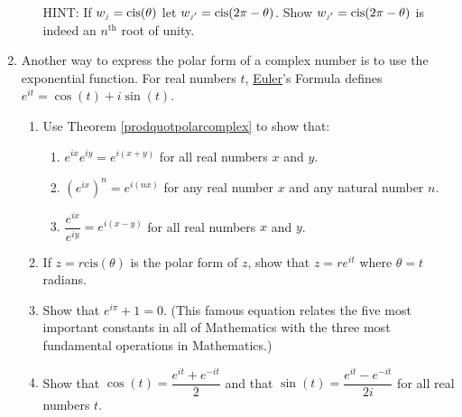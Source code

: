 \begin{enumerate}
\begin{enumerate}
 HINT: If $w_{\text{\tiny$j$}} = \text{cis}(\theta)$ let $w_{\text{\tiny$j'$}} = \text{cis}(2\pi - \theta)$. Show $w_{\text{\tiny$j'$}} = \text{cis}(2\pi - \theta)$ is indeed an $n^{\text{th}}$ root of unity.

\end{enumerate}

\item \label{eulerformulaexercise} Another way to express the polar form of a complex number is to use the exponential function.  For real numbers $t$, \href{http://en.wikipedia.org/wiki/Leonhard_Euler}{\underline{Euler}}'s Formula defines $e^{it} = \cos(t) + i \sin(t)$.  

\begin{enumerate}

\item Use Theorem \ref{prodquotpolarcomplex} to show that:

\begin{enumerate}

\item  $e^{ix} e^{iy} = e^{i(x+y)}$ for all real numbers $x$ and $y$.

\item  $\left(e^{ix}\right)^{n} = e^{i(nx)}$ for any real number $x$ and any natural number $n$.

\item $\dfrac{e^{ix}}{e^{iy}} = e^{i(x-y)}$ for all real numbers $x$ and $y$.

\end{enumerate}



\item If $z = r\text{cis}(\theta)$ is the polar form of $z$, show that $z = re^{it}$ where $\theta = t$ radians.

\item Show that $e^{i\pi} + 1 = 0$.  (This famous equation relates the five most important constants in all of Mathematics with the three most fundamental operations in Mathematics.)

\item  \label{expformcosandsin} Show that $\cos(t) = \dfrac{e^{it} + e^{-it}}{2}$ and that $\sin(t) = \dfrac{e^{it} - e^{-it}}{2i}$ for all real numbers $t$. 

\end{enumerate}

\end{enumerate}

\newpage

